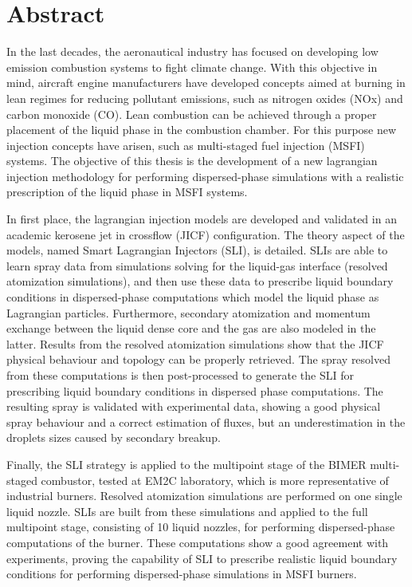 \chapter*{Abstract}
    
In the last decades, the aeronautical industry has focused on developing low emission combustion systems to fight climate change. With this objective in mind, aircraft engine manufacturers have developed concepts aimed at burning in lean regimes for reducing pollutant emissions, such as nitrogen oxides (NOx) and carbon monoxide (CO). Lean combustion can be achieved through a proper placement of the liquid phase in the combustion chamber. For this purpose new injection concepts have arisen, such as multi-staged fuel injection (MSFI) systems. The objective of this thesis is the development of a new lagrangian injection methodology for performing dispersed-phase simulations with a realistic prescription of the liquid phase in MSFI systems.

In first place, the lagrangian injection models are developed and validated in an academic kerosene jet in crossflow (JICF) configuration. The theory aspect of the models, named Smart Lagrangian Injectors (SLI), is detailed. SLIs are able to learn spray data from simulations solving for the liquid-gas interface (resolved atomization simulations), and then use these data to prescribe liquid boundary conditions in dispersed-phase computations which model the liquid phase as Lagrangian particles. Furthermore, secondary atomization and momentum exchange between the liquid dense core and the gas are also modeled in the latter.  Results from the resolved atomization simulations show that the JICF physical behaviour and topology can be properly retrieved. The spray resolved from these computations is then post-processed to generate the SLI for prescribing liquid boundary conditions in dispersed phase computations. The resulting spray is validated with experimental data, showing a good physical spray behaviour and a correct estimation of fluxes, but an underestimation in the droplets sizes caused by secondary breakup. 

Finally, the SLI strategy is applied to the multipoint stage of the BIMER multi-staged combustor, tested at EM2C laboratory, which is more representative of industrial burners. Resolved atomization simulations are performed on one single liquid nozzle. SLIs are built from these simulations and applied to the full multipoint stage, consisting of 10 liquid nozzles, for performing dispersed-phase computations of the burner. These computations show a good agreement with experiments, proving the capability of SLI to prescribe realistic liquid boundary conditions for performing dispersed-phase simulations in MSFI burners.


